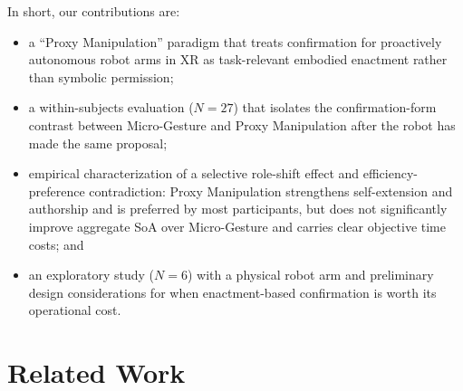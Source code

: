 \documentclass[sigconf,review,anonymous]{acmart}
\begin{document}
In short, our contributions are:
\begin{itemize}
\item[\textbf{(1)}] a ``Proxy Manipulation'' paradigm that treats confirmation for proactively autonomous robot arms in XR as task-relevant embodied enactment rather than symbolic permission;

\item[\textbf{(2)}] a within-subjects evaluation ($N=27$) that isolates the confirmation-form contrast between Micro-Gesture and Proxy Manipulation after the robot has made the same proposal;

\item[\textbf{(3)}] empirical characterization of a selective role-shift effect and efficiency-preference contradiction: Proxy Manipulation strengthens self-extension and authorship and is preferred by most participants, but does not significantly improve aggregate SoA over Micro-Gesture and carries clear objective time costs; and

\item[\textbf{(4)}] an exploratory study ($N=6$) with a physical robot arm and preliminary design considerations for when enactment-based confirmation is worth its operational cost.
\end{itemize}

\section{Related Work}

\end{document}

